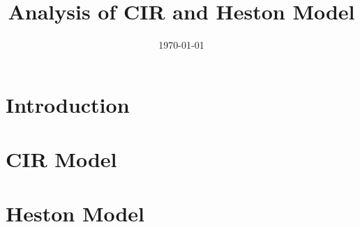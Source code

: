 \documentclass[
	xcolor={svgnames},
	hyperref={pagebackref,bookmarks},
	aspectratio=43,
]{beamer}
\title[]{Analysis of CIR and Heston Model}
\title{\presentationtitle}
\author[]{\presenter}
\institute[IITH]{
	\university\\
}
\date{\today}
\begin{document}
\newcommand{\brak}[1]{\ensuremath{\left( #1 \right)}}
\newcommand{\sbrak}[1]{\ensuremath{\left[ #1 \right]}}
\newcommand{\bigbrak}[1]{\ensuremath{\big{(} #1 \big{)}}}
\newcommand{\Bigbrak}[1]{\ensuremath{\Big{(} #1 \Big{)}}}
\newcommand{\Exp}[1]{\ensuremath{\mathbb{E} \left[ #1 \right]}}
\newcommand{\Var}[1]{\ensuremath{\text{Var} \left[ #1 \right]}}
\providecommand{\nCr}[2]{\ensuremath{\,^{#1}C_{#2}}}
\providecommand{\nPr}[2]{\ensuremath{\,^{#1}P_{#2}}}



\begin{frame}
	\titlepage
\end{frame}

\begin{frame}
	\tableofcontents
\end{frame}

\section{Introduction}


\section{CIR Model}


\section{Heston Model}

\end{document}
